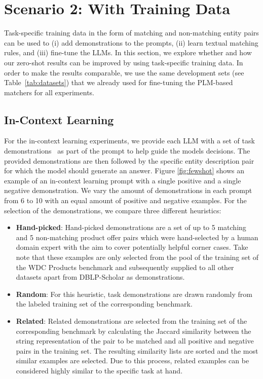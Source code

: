 \documentclass[sigconf,nonacm]{acmart}
\begin{document}
 \section{Scenario 2: With Training Data}
\label{sec:fewshotrulesfinetune}

Task-specific training data in the form of matching and non-matching entity pairs can be used to (i) add demonstrations to the prompts, (ii) learn textual matching rules, and (iii) fine-tune the LLMs.
In this section, we explore whether and how our zero-shot results can be improved by using task-specific training data. In order to make the results comparable, we use the same development sets (see Table~\ref{tab:datasets}) that we already used for fine-tuning the PLM-based matchers for all experiments. 

\subsection{In-Context Learning}
\label{subsec:incontext}

For the in-context learning experiments, we provide each LLM with a set of task demonstrations~\cite{liu-etal-2022-makes} as part of the prompt to help guide the models decisions. The provided demonstrations are then followed by the specific entity description pair for which the model should generate an answer. Figure \ref{fig:fewshot} shows an example of an in-context learning prompt with a single positive and a single negative demonstration. We vary the amount of demonstrations in each prompt from 6 to 10 with an equal amount of positive and negative examples. For the selection of the demonstrations, we compare three different heuristics:



\begin{itemize}
    \item \textbf{Hand-picked}: Hand-picked demonstrations are a set of up to 5 matching and 5 non-matching product offer pairs which were hand-selected by a human domain expert with the aim to cover potentially helpful corner cases. Take note that these examples are only selected from the pool of the training set of the WDC Products benchmark and subsequently supplied to all other datasets apart from DBLP-Scholar as demonstrations.
    \item \textbf{Random}: For this heuristic, task demonstrations are drawn randomly from the labeled training set of the corresponding benchmark.
\item \textbf{Related}: Related demonstrations are selected from the training set of the corresponding benchmark by calculating the Jaccard similarity between the string representation of the pair to be matched and all positive and negative pairs in the training set. The resulting similarity lists are sorted and the most similar examples are selected. Due to this process, related examples can be considered highly similar to the specific task at hand.
\end{itemize}
\end{document}
